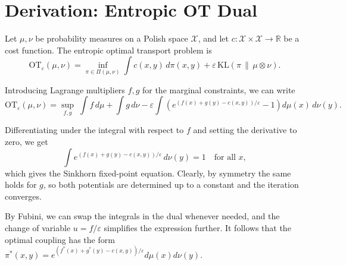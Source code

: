 \section*{Derivation: Entropic OT Dual}

Let $\mu, \nu$ be probability measures on a Polish space $\mathcal{X}$,
and let $c : \mathcal{X} \times \mathcal{X} \to \mathbb{R}$ be a cost function.
The entropic optimal transport problem is
\[
    \mathrm{OT}_\varepsilon(\mu, \nu)
    = \inf_{\pi \in \Pi(\mu,\nu)}
      \int c(x,y)\, d\pi(x,y)
      + \varepsilon\, \mathrm{KL}(\pi \,\|\, \mu \otimes \nu).
\]

Introducing Lagrange multipliers $f, g$ for the marginal constraints,
we can write
\[
    \mathrm{OT}_\varepsilon(\mu,\nu)
    = \sup_{f,g}\; \int f\, d\mu + \int g\, d\nu
      - \varepsilon \int \left( e^{(f(x)+g(y)-c(x,y))/\varepsilon} - 1 \right)
        d\mu(x)\, d\nu(y).
\]

Differentiating under the integral with respect to $f$ and setting the
derivative to zero, we get
\[
    \int e^{(f(x)+g(y)-c(x,y))/\varepsilon}\, d\nu(y) = 1
    \quad \text{for all } x,
\]
which gives the Sinkhorn fixed-point equation. Clearly, by symmetry the
same holds for $g$, so both potentials are determined up to a constant
and the iteration converges.

By Fubini, we can swap the integrals in the dual whenever needed,
and the change of variable $u = f/\varepsilon$ simplifies the
expression further. It follows that the optimal coupling has the form
$\pi^*(x,y) = e^{(f^*(x)+g^*(y)-c(x,y))/\varepsilon} d\mu(x)d\nu(y)$.

